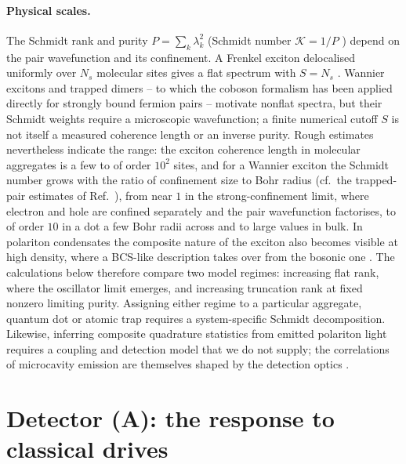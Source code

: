 \documentclass[11pt,a4paper]{article}
\begin{document}
\paragraph{Physical scales.}
The Schmidt rank and purity $P=\sum_k\lambda_k^2$ (Schmidt number $\mathcal K=1/P$ \cite{Law2005}) depend on the pair wavefunction and its confinement. A Frenkel exciton delocalised uniformly over $N_s$ molecular sites gives a flat spectrum with $S=N_s$ \cite{Shiau2017}. Wannier excitons and trapped dimers -- to which the coboson formalism has been applied directly for strongly bound fermion pairs \cite{Jimenez2023} -- motivate nonflat spectra, but their Schmidt weights require a microscopic wavefunction; a finite numerical cutoff $S$ is not itself a measured coherence length or an inverse purity. Rough estimates nevertheless indicate the range: the exciton coherence length in molecular aggregates is a few to of order $10^2$ sites, and for a Wannier exciton the Schmidt number grows with the ratio of confinement size to Bohr radius (cf.\ the trapped-pair estimates of Ref.~\cite{Law2005}), from near $1$ in the strong-confinement limit, where electron and hole are confined separately and the pair wavefunction factorises, to of order $10$ in a dot a few Bohr radii across and to large values in bulk. In polariton condensates the composite nature of the exciton also becomes visible at high density, where a BCS-like description takes over from the bosonic one \cite{Goodman2023}. The calculations below therefore compare two model regimes: increasing flat rank, where the oscillator limit emerges, and increasing truncation rank at fixed nonzero limiting purity. Assigning either regime to a particular aggregate, quantum dot or atomic trap requires a system-specific Schmidt decomposition. Likewise, inferring composite quadrature statistics from emitted polariton light \cite{Deng2010} requires a coupling and detection model that we do not supply; the correlations of microcavity emission are themselves shaped by the detection optics \cite{VanRegemortel2018}.

\section{Detector (A): the response to classical drives}
\label{sec:displacement}
\end{document}
